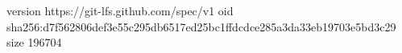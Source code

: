 version https://git-lfs.github.com/spec/v1
oid sha256:d7f562806def3e55c295db6517ed25bc1ffdcdce285a3da33eb19703e5bd3c29
size 196704
